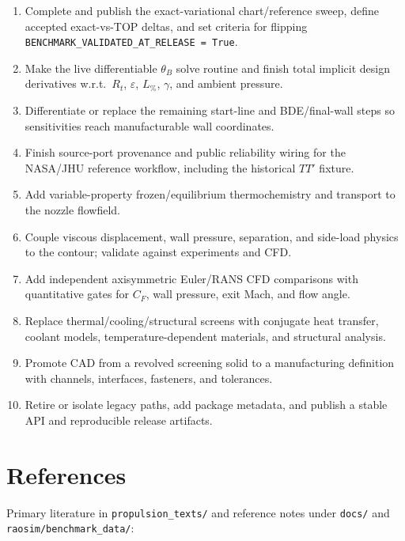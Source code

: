 \documentclass[11pt]{article}
\newcommand{\cmd}[1]{\nolinkurl{#1}}
\newcommand{\code}[1]{\texttt{#1}}
\begin{document}
\begin{enumerate}
\item Complete and publish the exact-variational chart/reference sweep, define
accepted exact-vs-TOP deltas, and set criteria for flipping
\code{BENCHMARK\_VALIDATED\_AT\_RELEASE = True}.
\item Make the live differentiable $\theta_B$ solve routine and finish total
implicit design derivatives w.r.t.\ $R_t$, $\varepsilon$, $L_{\%}$, $\gamma$,
and ambient pressure.
\item Differentiate or replace the remaining start-line and BDE/final-wall
steps so sensitivities reach manufacturable wall coordinates.
\item Finish source-port provenance and public reliability wiring for the
NASA/JHU reference workflow, including the historical $TT'$ fixture.
\item Add variable-property frozen/equilibrium thermochemistry and transport
to the nozzle flowfield.
\item Couple viscous displacement, wall pressure, separation, and side-load
physics to the contour; validate against experiments and CFD.
\item Add independent axisymmetric Euler/RANS CFD comparisons with
quantitative gates for $C_F$, wall pressure, exit Mach, and flow angle.
\item Replace thermal/cooling/structural screens with conjugate heat transfer,
coolant models, temperature-dependent materials, and structural analysis.
\item Promote CAD from a revolved screening solid to a manufacturing
definition with channels, interfaces, fasteners, and tolerances.
\item Retire or isolate legacy paths, add package metadata, and publish a
stable API and reproducible release artifacts.
\end{enumerate}

\section{References}

Primary literature in \cmd{propulsion_texts/} and reference notes under
\code{docs/} and \cmd{raosim/benchmark_data/}:
\end{document}
